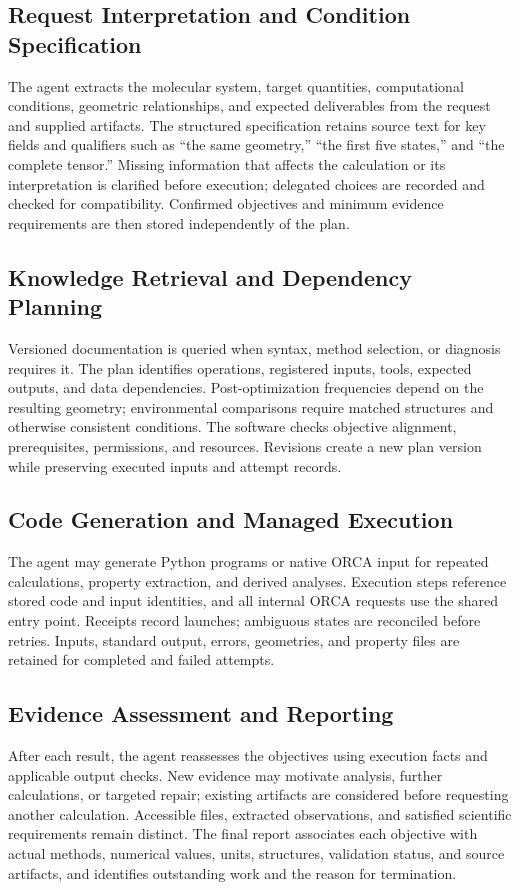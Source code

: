 \documentclass[a4paper,11pt]{article}
\begin{document}
\subsection{Request Interpretation and Condition Specification}
The agent extracts the molecular system, target quantities, computational conditions, geometric relationships, and expected deliverables from the request and supplied artifacts.
The structured specification retains source text for key fields and qualifiers such as ``the same geometry,'' ``the first five states,'' and ``the complete tensor.''
Missing information that affects the calculation or its interpretation is clarified before execution; delegated choices are recorded and checked for compatibility.
Confirmed objectives and minimum evidence requirements are then stored independently of the plan.

\subsection{Knowledge Retrieval and Dependency Planning}
\label{sec:knowledge-retrieval}
Versioned documentation is queried when syntax, method selection, or diagnosis requires it.
The plan identifies operations, registered inputs, tools, expected outputs, and data dependencies.
Post-optimization frequencies depend on the resulting geometry; environmental comparisons require matched structures and otherwise consistent conditions.
The software checks objective alignment, prerequisites, permissions, and resources.
Revisions create a new plan version while preserving executed inputs and attempt records.

\subsection{Code Generation and Managed Execution}
The agent may generate Python programs or native ORCA input for repeated calculations, property extraction, and derived analyses.
Execution steps reference stored code and input identities, and all internal ORCA requests use the shared entry point.
Receipts record launches; ambiguous states are reconciled before retries.
Inputs, standard output, errors, geometries, and property files are retained for completed and failed attempts.

\subsection{Evidence Assessment and Reporting}
After each result, the agent reassesses the objectives using execution facts and applicable output checks.
New evidence may motivate analysis, further calculations, or targeted repair; existing artifacts are considered before requesting another calculation.
Accessible files, extracted observations, and satisfied scientific requirements remain distinct.
The final report associates each objective with actual methods, numerical values, units, structures, validation status, and source artifacts, and identifies outstanding work and the reason for termination.
\end{document}
